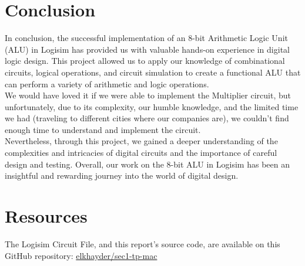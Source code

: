 \documentclass{article}
\begin{document}
\section{Conclusion}
In conclusion, the successful implementation of an 8-bit Arithmetic Logic Unit (ALU) in Logisim has provided us with valuable hands-on experience in digital logic design. This project allowed us to apply our knowledge of combinational circuits, logical operations, and circuit simulation to create a functional ALU that can perform a variety of arithmetic and logic operations. \\
We would have loved it if we were able to implement the Multiplier circuit, but unfortunately, due to its complexity, our humble knowledge, and the limited time we had (traveling to different cities where our companies are), we couldn't find enough time to understand and implement the circuit. \\
Nevertheless, through this project, we gained a deeper understanding of the complexities and intricacies of digital circuits and the importance of careful design and testing. Overall, our work on the 8-bit ALU in Logisim has been an insightful and rewarding journey into the world of digital design.

\section*{Resources}
The Logisim Circuit File, and this report's source code, are available on this GitHub repository: \href{https://github.com/elkhayder/sec1-tp-mac}{elkhayder/sec1-tp-mac} 
\end{document}
